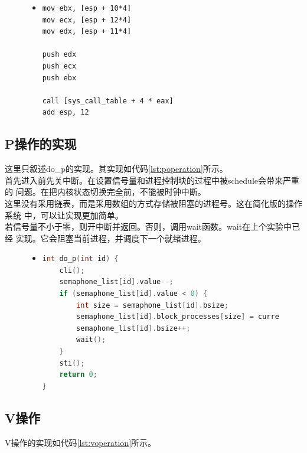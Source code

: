 \documentclass[a4paper]{article}
\begin{document}
    \begin{figure}[!hbt]
    \begin{itemize}
    \item[] \begin{lstlisting}[language={[x86masm]Assembler}, label=lst:syscall, caption=系统调用处理程序的部分实现]
mov ebx, [esp + 10*4]
mov ecx, [esp + 12*4]
mov edx, [esp + 11*4]

push edx
push ecx
push ebx

call [sys_call_table + 4 * eax] 
add esp, 12
    \end{lstlisting}
    \end{itemize}
    \end{figure}
    \subsection{P操作的实现}\label{sec:poperation}
这里只叙述do\_p的实现。其实现如代码\ref{lst:poperation}所示。\\ 

首先进入前先关中断。在设置信号量和进程控制块的过程中被schedule会带来严重的
问题。在把内核状态切换完全前，不能被时钟中断。\\ 

这里没有采用链表，而是采用数组的方式存储被阻塞的进程号。这在简化版的操作系统
中，可以让实现更加简单。\\ 

若信号量不小于零，则开中断并返回。否则，调用wait函数。wait在上个实验中已经
实现。它会阻塞当前进程，并调度下一个就绪进程。\\ 
    \begin{figure}[!hbt]
    \begin{itemize}
    \item[] \begin{lstlisting}[language=C, label=lst:poperation, caption=P操作的实现]
int do_p(int id) {
    cli(); 
    semaphone_list[id].value--;
    if (semaphone_list[id].value < 0) {
        int size = semaphone_list[id].bsize;
        semaphone_list[id].block_processes[size] = current;
        semaphone_list[id].bsize++;
        wait(); 
    }
    sti();
    return 0;
}
    \end{lstlisting}
    \end{itemize}
    \end{figure}
    \subsection{V操作}
    V操作的实现如代码\ref{lst:voperation}所示。\\ 
\end{document}
